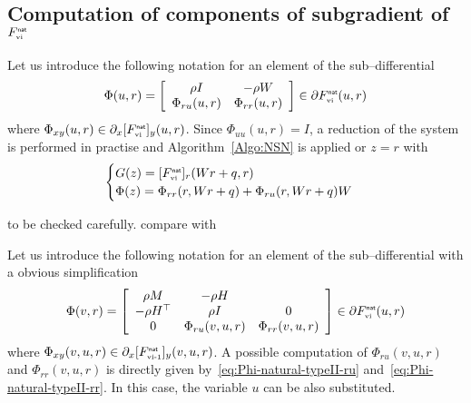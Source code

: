 \subsection{Computation of components of subgradient of $F_{{\hbox{\tiny{vi}}}}^{\hbox{\sf \tiny{nat}}}$}



 Let us introduce the following notation for an element of the sub--differential
\begin{equation}
  \label{eq:Phi-natural-typeII}
  \Phi(u, r)  = \left[
  \begin{array}{cc}
    \rho  I  &   - \rho W \\
     \Phi_{r u}(u,r) &   \Phi_{r r}(u,r)
  \end{array}\right] \in \partial F_{\vitwo}^\nat(u,r)
\end{equation}
where $ \Phi_{x y}(u,r) \in \partial_{x}[F_{{\hbox{\tiny{vi}}}}^{\hbox{\sf \tiny{nat}}}]_{y}(u,r)$. Since $\Phi_{u u}(u,r) = I $, a reduction of the system is performed in practise and Algorithm~\ref{Algo:NSN} is applied or $z =r$ with
\begin{equation}
  \label{eq:phiphi_ter}
  \begin{cases}
    G(z) = [F_{\vitwo}^\nat]_{r}(Wr+q,r) \\
    \Phi(z) = \Phi_{rr}(r,Wr+q) + \Phi_{ru}(r,Wr+q) W
  \end{cases}
\end{equation}
\begin{ndrva}
  to be checked carefully. compare with \cite{Hayashi.ea_SIOPT2005}
\end{ndrva}

 Let us introduce the following notation for an element of the sub--differential with a obvious simplification
\begin{equation}
  \label{eq:Phi-natural-typeI}
  \Phi(v,  r)  = \left[
  \begin{array}{ccc}
   \rho M &  - \rho H  \\
   -\rho H^\top &  \rho I &   0  \\
   0  &   \Phi_{r u}(v,u,r) &   \Phi_{r r}(v,u,r)
 \end{array}\right] \in \partial F_{\vitwo}^\nat(u,r)
\end{equation}
where $ \Phi_{x y}(v,u,r) \in \partial_{x}[F_{{\hbox{\tiny{vi-1}}}}^{\hbox{\sf \tiny{nat}}}]_{y}(v,u,r)$. A possible computation of  $\Phi_{r u}(v,u,r)$ and $\Phi_{r r}(v,u,r) $ is directly given by~\eqref{eq:Phi-natural-typeII-ru} and~\eqref{eq:Phi-natural-typeII-rr}. In this case, the variable $u$ can be also substituted.







